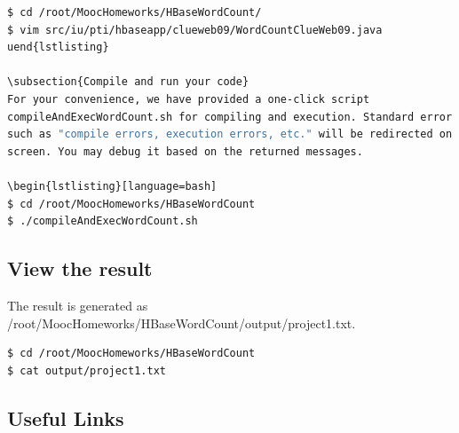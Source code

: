 \begin{lstlisting}[language=bash] 
$ cd /root/MoocHomeworks/HBaseWordCount/
$ vim src/iu/pti/hbaseapp/clueweb09/WordCountClueWeb09.java
uend{lstlisting}
 
\subsection{Compile and run your code}
For your convenience, we have provided a one-click script
compileAndExecWordCount.sh for compiling and execution. Standard error messages
such as "compile errors, execution errors, etc." will be redirected on the
screen. You may debug it based on the returned messages.

\begin{lstlisting}[language=bash] 
$ cd /root/MoocHomeworks/HBaseWordCount
$ ./compileAndExecWordCount.sh
\end{lstlisting}
 
\subsection{View the result}  
The result is generated as
/root/MoocHomeworks/HBaseWordCount/output/project1.txt. 

\begin{lstlisting}[language=bash] 
$ cd /root/MoocHomeworks/HBaseWordCount
$ cat output/project1.txt
\end{lstlisting}

\subsection{Useful Links}
